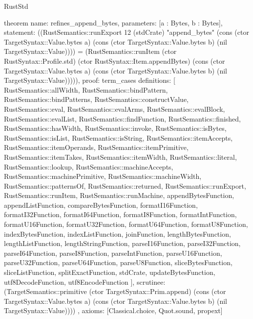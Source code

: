 \begin{lexlean}{RustStd}
\begin{semanticmodule}
theorem{
  name: refines_append_bytes,
  parameters: [a : Bytes, b : Bytes],
  statement: ((RustSemantics::runExport 12 (stdCrate) "append_bytes" (cons (ctor TargetSyntax::Value.bytes a) (cons (ctor TargetSyntax::Value.bytes b) (nil TargetSyntax::Value)))) = (RustSemantics::runItem (ctor RustSyntax::Profile.std) (ctor RustSyntax::Item.appendBytes) (cons (ctor TargetSyntax::Value.bytes a) (cons (ctor TargetSyntax::Value.bytes b) (nil TargetSyntax::Value))))),
  proof: term_cases{
    definitions: [
      RustSemantics::allWidth,
      RustSemantics::bindPattern,
      RustSemantics::bindPatterns,
      RustSemantics::constructValue,
      RustSemantics::eval,
      RustSemantics::evalArms,
      RustSemantics::evalBlock,
      RustSemantics::evalList,
      RustSemantics::findFunction,
      RustSemantics::finished,
      RustSemantics::hasWidth,
      RustSemantics::invoke,
      RustSemantics::isBytes,
      RustSemantics::isList,
      RustSemantics::isString,
      RustSemantics::itemAccepts,
      RustSemantics::itemOperands,
      RustSemantics::itemPrimitive,
      RustSemantics::itemTakes,
      RustSemantics::itemWidth,
      RustSemantics::literal,
      RustSemantics::lookup,
      RustSemantics::machineAccepts,
      RustSemantics::machinePrimitive,
      RustSemantics::machineWidth,
      RustSemantics::patternsOf,
      RustSemantics::returned,
      RustSemantics::runExport,
      RustSemantics::runItem,
      RustSemantics::runMachine,
      appendBytesFunction,
      appendListFunction,
      compareBytesFunction,
      formatI16Function,
      formatI32Function,
      formatI64Function,
      formatI8Function,
      formatIntFunction,
      formatU16Function,
      formatU32Function,
      formatU64Function,
      formatU8Function,
      indexBytesFunction,
      indexListFunction,
      joinFunction,
      lengthBytesFunction,
      lengthListFunction,
      lengthStringFunction,
      parseI16Function,
      parseI32Function,
      parseI64Function,
      parseI8Function,
      parseIntFunction,
      parseU16Function,
      parseU32Function,
      parseU64Function,
      parseU8Function,
      sliceBytesFunction,
      sliceListFunction,
      splitExactFunction,
      stdCrate,
      updateBytesFunction,
      utf8DecodeFunction,
      utf8EncodeFunction
    ],
    scrutinee: (TargetSemantics::primitive (ctor TargetSyntax::Prim.append) (cons (ctor TargetSyntax::Value.bytes a) (cons (ctor TargetSyntax::Value.bytes b) (nil TargetSyntax::Value))))
  },
  axioms: [Classical.choice, Quot.sound, propext]
}


\end{semanticmodule}
\end{lexlean}
